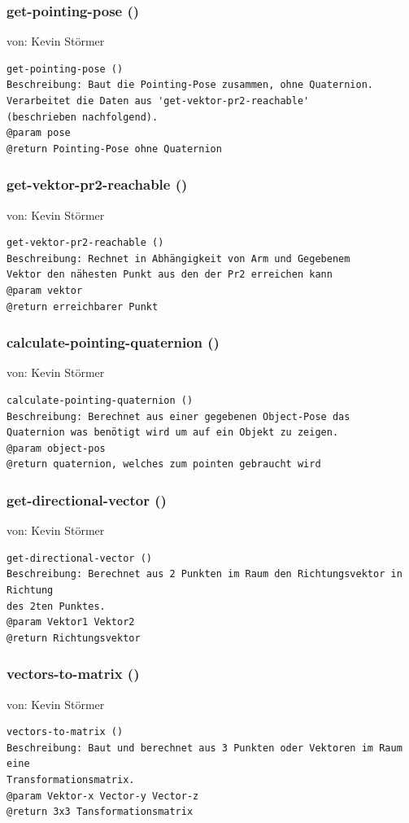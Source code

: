 \documentclass{suturo}
\makeatletter
\newcommand{\chapterauthor}[1]{%
  {\parindent0pt\vspace*{-27pt}%
  \linespread{0}\small\begin{flushright}von: #1\end{flushright}%
  \par\nobreak\vspace*{0pt}}
  \@afterheading%
}
\makeatother
\begin{document}
\subsubsection{get-pointing-pose ()}
\chapterauthor{Kevin Störmer}
\begin{verbatim}
get-pointing-pose ()
Beschreibung: Baut die Pointing-Pose zusammen, ohne Quaternion. 
Verarbeitet die Daten aus 'get-vektor-pr2-reachable' 
(beschrieben nachfolgend). 
@param pose
@return Pointing-Pose ohne Quaternion
\end{verbatim}

\subsubsection{get-vektor-pr2-reachable ()}
\chapterauthor{Kevin Störmer}
\begin{verbatim}
get-vektor-pr2-reachable ()
Beschreibung: Rechnet in Abhängigkeit von Arm und Gegebenem 
Vektor den nähesten Punkt aus den der Pr2 erreichen kann
@param vektor
@return erreichbarer Punkt
\end{verbatim}

\subsubsection{calculate-pointing-quaternion ()}
\chapterauthor{Kevin Störmer}
\begin{verbatim}
calculate-pointing-quaternion ()
Beschreibung: Berechnet aus einer gegebenen Object-Pose das 
Quaternion was benötigt wird um auf ein Objekt zu zeigen. 
@param object-pos
@return quaternion, welches zum pointen gebraucht wird
\end{verbatim}

\subsubsection{get-directional-vector ()}
\chapterauthor{Kevin Störmer}
\begin{verbatim}
get-directional-vector ()
Beschreibung: Berechnet aus 2 Punkten im Raum den Richtungsvektor in Richtung 
des 2ten Punktes.
@param Vektor1 Vektor2
@return Richtungsvektor
\end{verbatim}

\subsubsection{vectors-to-matrix ()}
\chapterauthor{Kevin Störmer}
\begin{verbatim}
vectors-to-matrix ()
Beschreibung: Baut und berechnet aus 3 Punkten oder Vektoren im Raum eine 
Transformationsmatrix.
@param Vektor-x Vector-y Vector-z
@return 3x3 Tansformationsmatrix
\end{verbatim}
\end{document}
